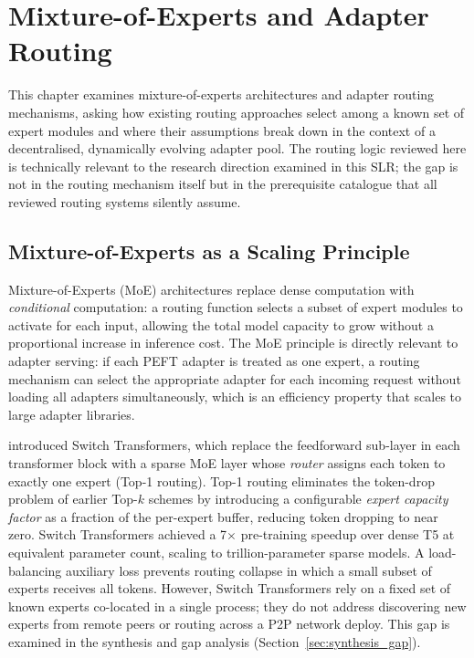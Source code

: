 \section{Mixture-of-Experts and Adapter Routing}
\label{sec:moe_routing}

This chapter examines mixture-of-experts architectures and adapter routing
mechanisms, asking how existing routing approaches select among a known set of
expert modules and where their assumptions break down in the context of a
decentralised, dynamically evolving adapter pool. The routing logic reviewed
here is technically relevant to the research direction examined in this SLR;
the gap is not in the routing mechanism itself but in the prerequisite catalogue
that all reviewed routing systems silently assume.

\subsection{Mixture-of-Experts as a Scaling Principle}
\label{sec:moe_routing:foundations}

Mixture-of-Experts (MoE) architectures \citep{ShazeerMoE2017} replace dense computation with \textit{conditional}
computation: a routing function selects a subset of expert modules to activate for each
input, allowing the total model capacity to grow without a proportional increase in
inference cost. The MoE principle is directly relevant to adapter serving: if each
PEFT adapter is treated as one expert, a routing mechanism can select the appropriate
adapter for each incoming request without loading all adapters simultaneously, which is an
efficiency property that scales to large adapter libraries.

\citet{Fedus2022} introduced Switch Transformers, which replace the feedforward
sub-layer in each transformer block with a sparse MoE layer whose \textit{router}
assigns each token to exactly one expert (Top-1 routing). Top-1 routing eliminates the
token-drop problem of earlier Top-$k$ schemes by introducing a configurable \textit{expert
capacity factor} as a fraction of the per-expert buffer, reducing token dropping to near zero. Switch Transformers achieved
a 7$\times$ pre-training speedup over dense T5 at equivalent parameter count, scaling
to trillion-parameter sparse models. A load-balancing auxiliary loss prevents routing
collapse in which a small subset of experts receives all tokens. However, Switch
Transformers rely on a fixed set of known experts co-located in a single process; they do
not address discovering new experts from remote peers or routing across a P2P network
deploy. This gap is examined in the synthesis and gap analysis
(Section~\ref{sec:synthesis_gap}).

